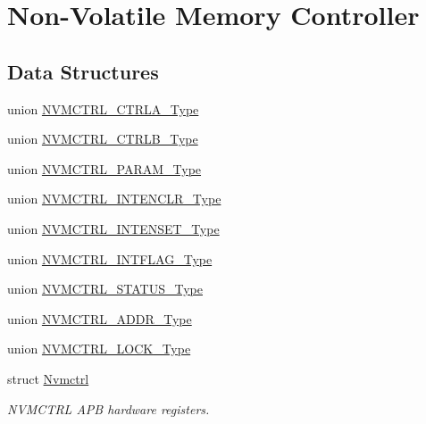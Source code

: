 \hypertarget{group___s_a_m_d21___n_v_m_c_t_r_l}{}\section{Non-\/\+Volatile Memory Controller}
\label{group___s_a_m_d21___n_v_m_c_t_r_l}
\subsection*{Data Structures}
\begin{DoxyCompactItemize}
\item 
union \mbox{\hyperlink{union_n_v_m_c_t_r_l___c_t_r_l_a___type}{N\+V\+M\+C\+T\+R\+L\+\_\+\+C\+T\+R\+L\+A\+\_\+\+Type}}
\item 
union \mbox{\hyperlink{union_n_v_m_c_t_r_l___c_t_r_l_b___type}{N\+V\+M\+C\+T\+R\+L\+\_\+\+C\+T\+R\+L\+B\+\_\+\+Type}}
\item 
union \mbox{\hyperlink{union_n_v_m_c_t_r_l___p_a_r_a_m___type}{N\+V\+M\+C\+T\+R\+L\+\_\+\+P\+A\+R\+A\+M\+\_\+\+Type}}
\item 
union \mbox{\hyperlink{union_n_v_m_c_t_r_l___i_n_t_e_n_c_l_r___type}{N\+V\+M\+C\+T\+R\+L\+\_\+\+I\+N\+T\+E\+N\+C\+L\+R\+\_\+\+Type}}
\item 
union \mbox{\hyperlink{union_n_v_m_c_t_r_l___i_n_t_e_n_s_e_t___type}{N\+V\+M\+C\+T\+R\+L\+\_\+\+I\+N\+T\+E\+N\+S\+E\+T\+\_\+\+Type}}
\item 
union \mbox{\hyperlink{union_n_v_m_c_t_r_l___i_n_t_f_l_a_g___type}{N\+V\+M\+C\+T\+R\+L\+\_\+\+I\+N\+T\+F\+L\+A\+G\+\_\+\+Type}}
\item 
union \mbox{\hyperlink{union_n_v_m_c_t_r_l___s_t_a_t_u_s___type}{N\+V\+M\+C\+T\+R\+L\+\_\+\+S\+T\+A\+T\+U\+S\+\_\+\+Type}}
\item 
union \mbox{\hyperlink{union_n_v_m_c_t_r_l___a_d_d_r___type}{N\+V\+M\+C\+T\+R\+L\+\_\+\+A\+D\+D\+R\+\_\+\+Type}}
\item 
union \mbox{\hyperlink{union_n_v_m_c_t_r_l___l_o_c_k___type}{N\+V\+M\+C\+T\+R\+L\+\_\+\+L\+O\+C\+K\+\_\+\+Type}}
\item 
struct \mbox{\hyperlink{struct_nvmctrl}{Nvmctrl}}
\begin{DoxyCompactList}\small\item\em N\+V\+M\+C\+T\+RL A\+PB hardware registers. \end{DoxyCompactList}\end{DoxyCompactItemize}
